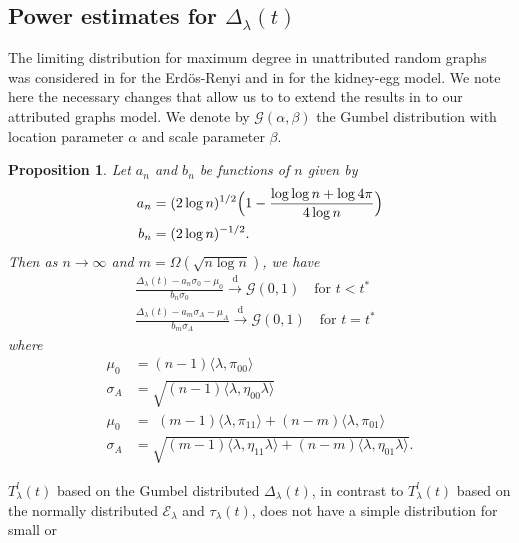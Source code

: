 \documentclass[10pt,draftclsnofoot,onecolumn]{IEEEtran}
\newtheorem{proposition}[theorem]{Proposition}
\theoremstyle{definition}
\begin{document}
\subsection{Power estimates for $\Delta_{\lambda}(t)$}
\label{sec:power-estim-delt}
The limiting distribution for maximum degree in unattributed random
graphs was considered in \cite{bollobas85:_random_graph} for the
Erd\"{o}s-Renyi and in \cite{rukhin11} for the kidney-egg model. We
note here the necessary changes that allow us to to extend the results
in \cite{bollobas85:_random_graph,rukhin11} to our attributed graphs
model. We denote by $\mathcal{G}(\alpha,\beta)$ the Gumbel
distribution with location parameter $\alpha$ and scale parameter
$\beta$.
\begin{proposition}
  \label{prop:3}
  Let $a_n$ and $b_n$ be functions of $n$ given by
  \begin{align*}
    a_n &= (2 \log{n})^{1/2}\Bigl(1 - \frac{\log{\log{n}} + \log{4\pi}}{4 \log{n}} \Bigr) \\ 
    b_n &= (2 \log{n})^{-1/2}.
  \end{align*}
  Then as $n \rightarrow \infty$ and $m = \Omega( \sqrt{n \log{n}})$,
  we have
  \begin{gather}
    \label{eq:14}
    \frac{\Delta_{\lambda}(t) - a_{n} \sigma_0 - \mu_0}{b_n \sigma_0}
   \overset{\mathrm{d}}{\longrightarrow}  \mathcal{G}(0,1) \quad \text{for $t < t^{*}$ } \\
    \frac{\Delta_{\lambda}(t) - a_{m} \sigma_A - \mu_A}{b_m \sigma_A}
       \overset{\mathrm{d}}{\longrightarrow}\mathcal{G}(0,1) \quad \text{for $t = t^{*}$ }
  \end{gather}
  where
  \begin{align*}
    \mu_0 &= (n-1)\langle \lambda, \pi_{00} \rangle \\
    \sigma_A &= \sqrt{(n-1)\langle \lambda, \eta_{00} \lambda \rangle} \\
    \mu_0 &= \,\, (m - 1) \langle \lambda, \pi_{11} \rangle + (n-
    m)\langle \lambda, \pi_{01} \rangle
    \\ \sigma_A &= \sqrt{ (m - 1) \langle \lambda, \eta_{11} \lambda \rangle + (n -
      m) \langle \lambda, \eta_{01} \lambda \rangle}.
    \end{align*}
\end{proposition}
$T_{\lambda}^{l}(t)$ based on the Gumbel distributed
$\Delta_{\lambda}(t)$, in contrast to $T_{\lambda}^{l}(t)$ based on
the normally distributed $\mathcal{E}_{\lambda}$ and
$\tau_{\lambda}(t)$, does not have a simple distribution for small or
\end{document}
